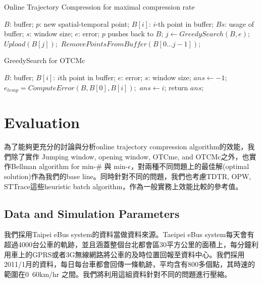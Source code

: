 \documentclass[12pt]{article}
\begin{document}
\begin{CJK}{UTF8}{bsmi}
\begin{algorithm}[h]
  \caption{Online Trajectory Compression for maximal compression rate}
  \begin{algorithmic}[3]
   \Require
   	  $B$: buffer;
	  $p$: new spatial-temporal point;
      $B[i]$: $i$-th point in buffer;
      $Bs$: usage of buffer;
      $s$: window size;
      $e$: error;
   \Ensure
    \State $p$ pushes back to $B$;
		\State $j \gets GreedySearch(B,e)$;
		\State $Upload(B[j]);$
		\State $RemovePointsFromBuffer(B[0 ... j-1])$;
    \EndIf
      \end{algorithmic}
\end{algorithm}


\begin{algorithm}[h]
  \caption{GreedySearch for OTCMc}
  \begin{algorithmic}[4]
   \Require
   	  $B$: buffer;
      $B[i]$: $i$th point in buffer;
      $e$: error;
      $s$: window size;
   \Ensure
   \State $ans \gets -1;$
     \State $e_{temp} = ComputeError(B,{B[0],B[i]});$
     	\State $ans \gets i$;
	 \EndIf
   \EndFor
   \State return $ans$;
   \end{algorithmic}
\end{algorithm}



\section{Evaluation}

為了能夠更充分的討論與分析online trajectory compression algorithm的效能，我們除了實作 Jumping window, opening window, OTCme, and OTCMc之外，也實作Bellman algorithm for min-\# 與 min-$\epsilon$，對兩種不同問題上的最佳解(optimal solution)作為我們的base line。同時針對不同的問題，我們也考慮TDTR, OPW, STTrace這些heuristic batch algorithm，作為一般實務上效能比較的參考值。\\


\subsection{Data and Simulation Parameters}

我們採用Taipei eBus system的資料當做資料來源。Taeipei eBus system每天會有超過4000台公車的軌跡，並且涵蓋整個台北都會區30平方公里的面積上，每分鐘利用車上的GPRS或者3G無線網路將公車的及時位置回報至資料中心。我們採用2011/1月的資料，每日每台車都會回傳一條軌跡，平均含有800多個點，其時速的範圍在0~60km/hr 之間。我們將利用這組資料針對不同的問題進行壓縮。\\



\end{CJK}
\end{document}
